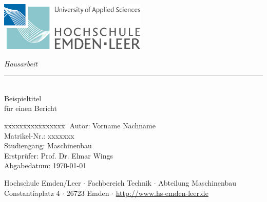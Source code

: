 %
%

\begin{titlepage}
    
    \begin{flushleft} 
        \includegraphics[width=7cm]{General/HS_EmdenLeer_Logo.png}
    \end{flushleft} 
    
    \begin{flushright}
        \vspace{2cm}
        \LARGE \textsl{Hausarbeit}\\
        \rule{0.6\textwidth}{0.4pt} ~\\
        \vspace{0.5cm}
        \textsf{\LARGE Beispieltitel}\\
        \textsf{\LARGE für einen Bericht}
    \end{flushright}
    
    \vspace{3cm}
    \large
    \begin{tabbing}
        xxxxxxxxxxxxxxxx \= \kill
        Autor: \> Vorname Nachname \\
        Matrikel-Nr.: \> xxxxxxx \\
        Studiengang: \> Maschinenbau \\ [0.5cm]
        Erstprüfer: \> Prof. Dr. Elmar Wings \\
        Abgabedatum: \> \today \\
    \end{tabbing}
    
    \vspace{3cm}
    \small
    \begin{center}
        Hochschule Emden/Leer $\cdot$ 
        Fachbereich Technik $\cdot$ 
        Abteilung Maschinenbau \\
        Constantiaplatz 4 $\cdot$ 
        26723 Emden $\cdot$ 
        \url{http://www.hs-emden-leer.de}
    \end{center}
    
\end{titlepage}

